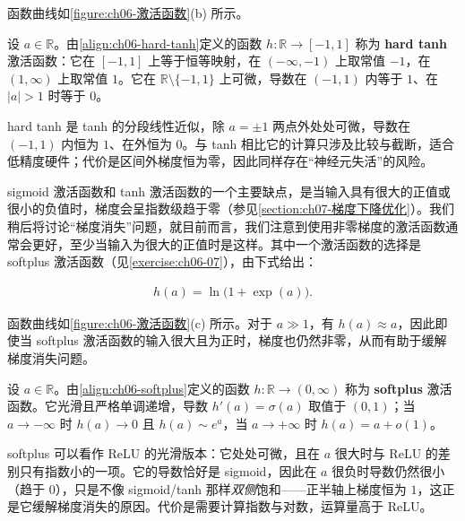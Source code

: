 \documentclass[../../main.tex]{subfiles}
\begin{document}
函数曲线如\cref{figure:ch06-激活函数}(b) 所示。

\begin{definition}\label{definition:ch06-hard-tanh}
设 $a\in\mathbb{R}$。由\eqref{align:ch06-hard-tanh}定义的函数 $h:\mathbb{R}\to[-1,1]$ 称为 \textbf{hard tanh} 激活函数：它在 $[-1,1]$ 上等于恒等映射，在 $(-\infty,-1)$ 上取常值 $-1$，在 $(1,\infty)$ 上取常值 $1$。它在 $\mathbb{R}\setminus\{-1,1\}$ 上可微，导数在 $(-1,1)$ 内等于 $1$、在 $|a|>1$ 时等于 $0$。
\end{definition}

\begin{remark}hard tanh 是 tanh 的分段线性近似，除 $a=\pm1$ 两点外处处可微，导数在 $(-1,1)$ 内恒为 $1$、在外恒为 $0$。与 tanh 相比它的计算只涉及比较与截断，适合低精度硬件；代价是区间外梯度恒为零，因此同样存在“神经元失活”的风险。
\end{remark}

sigmoid 激活函数和 tanh 激活函数的一个主要缺点，是当输入具有很大的正值或很小的负值时，梯度会呈指数级趋于零（参见\cref{section:ch07-梯度下降优化}）。我们稍后将讨论“梯度消失”问题，就目前而言，我们注意到使用非零梯度的激活函数通常会更好，至少当输入为很大的正值时是这样。其中一个激活函数的选择是 softplus 激活函数（见\cref{exercise:ch06-07}），由下式给出：

\begin{align}
h(a)=\ln\bigl(1+\exp(a)\bigr).
\label{align:ch06-softplus}
\end{align}

函数曲线如\cref{figure:ch06-激活函数}(c) 所示。对于 $a\gg1$，有 $h(a)\approx a$，因此即使当 softplus 激活函数的输入很大且为正时，梯度也仍然非零，从而有助于缓解梯度消失问题。

\begin{definition}[softplus]\label{definition:ch06-softplus}
设 $a\in\mathbb{R}$。由\eqref{align:ch06-softplus}定义的函数 $h:\mathbb{R}\to(0,\infty)$ 称为 \textbf{softplus} 激活函数。它光滑且严格单调递增，导数 $h'(a)=\sigma(a)$ 取值于 $(0,1)$；当 $a\to-\infty$ 时 $h(a)\to0$ 且 $h(a)\sim e^{a}$，当 $a\to+\infty$ 时 $h(a)=a+o(1)$。
\end{definition}

\begin{remark}softplus 可以看作 ReLU 的光滑版本：它处处可微，且在 $a$ 很大时与 ReLU 的差别只有指数小的一项。它的导数恰好是 sigmoid，因此在 $a$ 很负时导数仍然很小（趋于 $0$），只是不像 sigmoid/tanh 那样\emph{双侧}饱和——正半轴上梯度恒为 $1$，这正是它缓解梯度消失的原因。代价是需要计算指数与对数，运算量高于 ReLU。
\end{remark}
\end{document}
